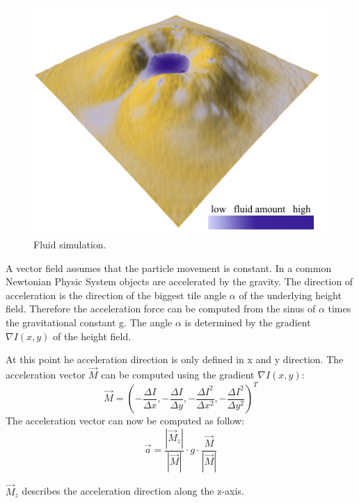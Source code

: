 \begin{figure}
	\centering
	\includegraphics[width=\linewidth]{NWD05/hydraulic_errosion_b}
	\caption{Fluid simulation.}
	\label{fig:fluid_Sim}
\end{figure}

A vector field assumes that the particle movement is constant. In a common Newtonian Physic System objects are accelerated by the gravity. The direction of acceleration is the direction of the biggest tile angle $\alpha$ of the underlying height field. Therefore the acceleration force can be computed from the sinus of $\alpha$ times the gravitational constant g. The angle $\alpha$ is determined by the gradient $\nabla I(x,y)$ of the height field. 

At this point he acceleration direction is only defined in x and y direction. The acceleration vector $\vec{M}$ can be computed using the gradient $\nabla I(x,y)$: 
$$\vec{M} = (- \frac{\Delta I}{\Delta x}, - \frac{\Delta I}{\Delta y}, - \frac{\Delta I^2}{\Delta x^2}, - \frac{\Delta I^2}{\Delta y^2})^T$$
The acceleration vector can now be computed as follow: 
$$\vec{a}= \frac{|\vec{M}_z|}{|\vec{M}|} \cdot g \cdot \frac{\vec{M}}{|\vec{M}|}$$

$\vec{M}_z$ describes the acceleration direction along the z-axis.

